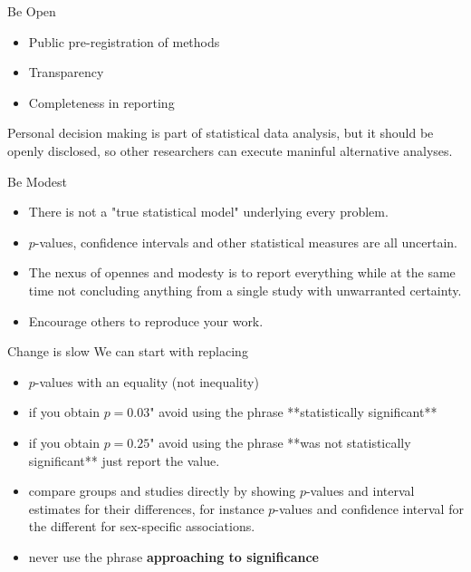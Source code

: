 \documentclass{beamer}
\begin{document}
\begin{frame}{Be Open}
	
\begin{itemize}
	\item  Public pre-registration of methods
	\item Transparency
	\item Completeness in reporting
\end{itemize}	
Personal decision making is part of statistical data analysis, but it should be openly disclosed, so other researchers can execute maninful alternative analyses.
\end{frame}

\begin{frame}{Be Modest}

\begin{itemize}
	\item There is not a "true statistical model" underlying every problem.
	\item $p$-values, confidence intervals and other statistical measures are all uncertain.
	\item The nexus of opennes and modesty is to report everything while at the same time not concluding anything from a single study with unwarranted certainty. 
	\item Encourage others to reproduce your work. 
\end{itemize}
	
\end{frame}

\begin{frame}{Change is slow}
We can start with replacing

\begin{itemize}
	\item $p$-values with an equality (not inequality)
	\item  if you obtain $p=0.03$" avoid using the phrase **statistically significant**
	\item  if you obtain $p=0.25$" avoid using the phrase **was not statistically significant** just report the value.
	\item  compare groups and studies directly by showing $p$-values and interval estimates for their differences, for instance $p$-values and confidence interval for the different for sex-specific associations. 
	\item never use the phrase \textbf{approaching to significance} 
\end{itemize}

\end{frame}
\end{document}
